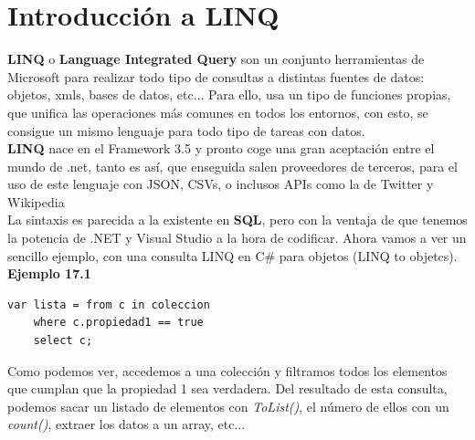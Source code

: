 \documentclass[12pt,a4paper]{report}
\begin{document}
\section{Introducción a LINQ}
\textbf{LINQ} o\textbf{ Language Integrated Query} son un conjunto herramientas de Microsoft para realizar todo tipo de consultas a distintas fuentes de datos: objetos, xmls, bases de datos, etc... Para ello, usa un tipo de funciones propias, que unifica las operaciones más comunes en todos los entornos, con esto, se consigue un mismo lenguaje para todo tipo de tareas con datos.\\\textbf{LINQ} nace en el Framework 3.5 y pronto coge una gran aceptación entre el mundo de .net, tanto es así, que enseguida salen proveedores de terceros, para el uso de este lenguaje con JSON, CSVs, o inclusos APIs como la de Twitter y Wikipedia\\La sintaxis es parecida a la existente en\textbf{ SQL}, pero con la ventaja de que tenemos la potencia de .NET y Visual Studio a la hora de codificar. Ahora vamos a ver un sencillo ejemplo, con una consulta LINQ en C\# para objetos (LINQ to objetcs).\\\textbf{Ejemplo 17.1}
\begin{lstlisting}
var lista = from c in coleccion
	where c.propiedad1 == true
	select c;
\end{lstlisting}Como podemos ver, accedemos a una colección y filtramos todos los elementos que cumplan que la propiedad 1 sea verdadera. Del resultado de esta consulta, podemos sacar un listado de elementos con\textit{ ToList()}, el número de ellos con un\textit{ count()}, extraer los datos a un array, etc...
\end{document}
